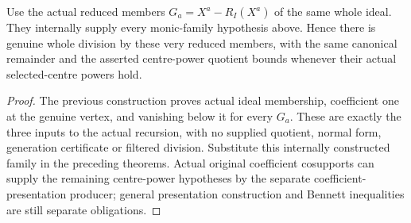 \begin{corollary}
\label{hir:actual-reduced-basis-entire-filtered-division}
\leanok
Use the actual reduced members $G_a=X^a-R_I(X^a)$ of the same whole ideal.
They internally supply every monic-family hypothesis above. Hence there
is genuine whole division by these very reduced members, with the same
canonical remainder and the asserted centre-power quotient bounds whenever
their actual selected-centre powers hold.
\end{corollary}
\begin{proof}
The previous construction proves actual ideal membership, coefficient one
at the genuine vertex, and vanishing below it for every $G_a$. These are
exactly the three inputs to the actual recursion, with no supplied quotient,
normal form, generation certificate or filtered division. Substitute this
internally constructed family in the preceding theorems. Actual original
coefficient cosupports can supply the remaining centre-power hypotheses by
the separate coefficient-presentation producer; general presentation
construction and Bennett inequalities are still separate obligations.
\end{proof}
